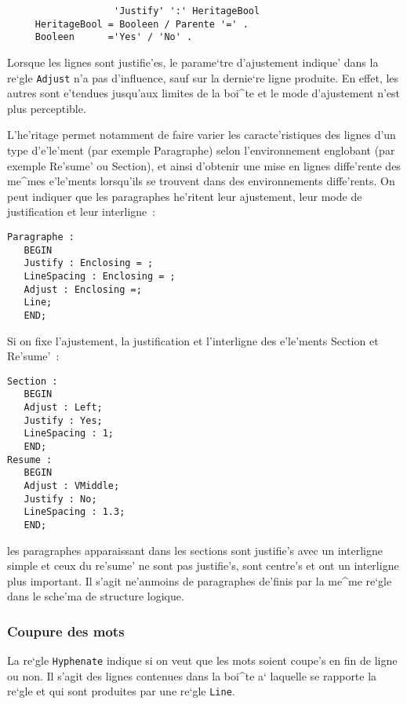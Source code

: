 {\begin{verbatim}
                   'Justify' ':' HeritageBool
     HeritageBool = Booleen / Parente '=' .
     Booleen      ='Yes' / 'No' .
\end{verbatim}

Lorsque les lignes sont justifie'es, le parame`tre d'ajustement indique' dans
la re`gle {\tt Adjust} n'a pas d'influence, sauf sur la dernie`re ligne
produite. En effet, les autres sont e'tendues jusqu'aux limites de la boi^te
et le mode d'ajustement n'est plus perceptible.

\begin{example}
L'he'ritage permet notamment de faire varier les caracte'ristiques des
lignes d'un type d'e'le'ment (par exemple Paragraphe) selon l'environnement
englobant (par exemple Re'sume' ou Section), et ainsi d'obtenir une mise
en lignes diffe'rente des me^mes e'le'ments lorsqu'ils se trouvent dans des
environnements diffe'rents. On peut indiquer que les paragraphes he'ritent
leur ajustement, leur mode de justification et leur interligne~:
\begin{verbatim}
Paragraphe :
   BEGIN
   Justify : Enclosing = ;
   LineSpacing : Enclosing = ;
   Adjust : Enclosing =;
   Line;
   END;
\end{verbatim}
Si on fixe l'ajustement, la justification et l'interligne des e'le'ments
Section et Re'sume'~:
\begin{verbatim}
Section :
   BEGIN
   Adjust : Left;
   Justify : Yes;
   LineSpacing : 1;
   END;
Resume :
   BEGIN
   Adjust : VMiddle;
   Justify : No;
   LineSpacing : 1.3;
   END;
\end{verbatim}
les paragraphes apparaissant dans les sections sont justifie's avec un
interligne simple et ceux du re'sume' ne sont pas justifie's, sont centre's
et ont un interligne plus important. Il s'agit ne'anmoins de paragraphes
de'finis par la me^me re`gle dans le sche'ma de structure logique.
\end{example}

\subsubsection{Coupure des mots}
\label{reglehyphenate}

La re`gle {\tt Hyphenate} indique si on veut que les mots soient coupe's
en fin de ligne ou non. Il s'agit des lignes contenues dans la boi^te a`
laquelle se rapporte la re`gle et qui sont produites par une re`gle {\tt Line}.

}
